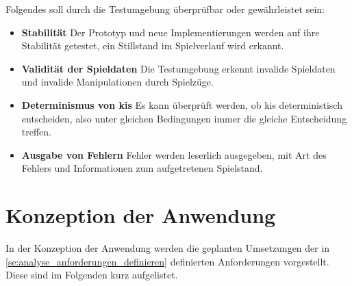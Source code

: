 \documentclass[
							a4paper, 
							11pt, 
							openany, 
							liststotoc,
							parskip=half, 
   							headings=normal
						]{scrreprt}
\begin{document}
{Folgendes soll durch die Testumgebung überprüfbar oder gewährleistet sein:
\begin{itemize}
	\item \textbf{Stabilität}\newline
Der Prototyp und neue Implementierungen werden auf ihre Stabilität getestet, ein Stillstand im Spielverlauf wird erkannt.
	\item \textbf{Validität der Spieldaten}\newline
Die Testumgebung erkennt invalide Spieldaten und invalide Manipulationen durch Spielzüge.
	\item \textbf{Determinismus von \acs{ki}s}\newline
Es kann überprüft werden, ob \acs{ki}s deterministisch entscheiden, also unter gleichen Bedingungen immer die gleiche Entscheidung treffen.
	\item \textbf{Ausgabe von Fehlern}\newline
Fehler werden leserlich ausgegeben, mit Art des Fehlers und Informationen zum aufgetretenen Spielstand.	
\end{itemize}

\section{Konzeption der Anwendung}
\label{se:analyse_umsetzung_anforderungen}
In der Konzeption der Anwendung werden die geplanten Umsetzungen der in \autoref{se:analyse_anforderungen_definieren} definierten Anforderungen vorgestellt. Diese sind im Folgenden kurz aufgelistet.

}
\end{document}
